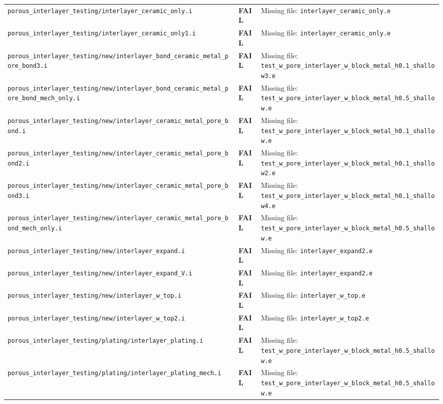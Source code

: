 \documentclass[10pt,letterpaper]{article}
\newcommand{\FAIL}{\textcolor{failred}{\textbf{FAIL}}}
\newcommand{\code}[1]{\texttt{\small #1}}
\begin{document}
\begin{longtable}{p{} l p{}}
\code{porous\_interlayer\_testing/interlayer\_ceramic\_only.i} & \FAIL & Missing file: \code{interlayer\_ceramic\_only.e} \\
\code{porous\_interlayer\_testing/interlayer\_ceramic\_only1.i} & \FAIL & Missing file: \code{interlayer\_ceramic\_only.e} \\
\code{porous\_interlayer\_testing/new/interlayer\_bond\_ceramic\_metal\_pore\_bond3.i} & \FAIL & Missing file: \code{test\_w\_pore\_interlayer\_w\_block\_metal\_h0.1\_shallow3.e} \\
\code{porous\_interlayer\_testing/new/interlayer\_bond\_ceramic\_metal\_pore\_bond\_mech\_only.i} & \FAIL & Missing file: \code{test\_w\_pore\_interlayer\_w\_block\_metal\_h0.5\_shallow.e} \\
\code{porous\_interlayer\_testing/new/interlayer\_ceramic\_metal\_pore\_bond.i} & \FAIL & Missing file: \code{test\_w\_pore\_interlayer\_w\_block\_metal\_h0.1\_shallow.e} \\
\code{porous\_interlayer\_testing/new/interlayer\_ceramic\_metal\_pore\_bond2.i} & \FAIL & Missing file: \code{test\_w\_pore\_interlayer\_w\_block\_metal\_h0.1\_shallow2.e} \\
\code{porous\_interlayer\_testing/new/interlayer\_ceramic\_metal\_pore\_bond3.i} & \FAIL & Missing file: \code{test\_w\_pore\_interlayer\_w\_block\_metal\_h0.1\_shallow4.e} \\
\code{porous\_interlayer\_testing/new/interlayer\_ceramic\_metal\_pore\_bond\_mech\_only.i} & \FAIL & Missing file: \code{test\_w\_pore\_interlayer\_w\_block\_metal\_h0.5\_shallow.e} \\
\code{porous\_interlayer\_testing/new/interlayer\_expand.i} & \FAIL & Missing file: \code{interlayer\_expand2.e} \\
\code{porous\_interlayer\_testing/new/interlayer\_expand\_V.i} & \FAIL & Missing file: \code{interlayer\_expand2.e} \\
\code{porous\_interlayer\_testing/new/interlayer\_w\_top.i} & \FAIL & Missing file: \code{interlayer\_w\_top.e} \\
\code{porous\_interlayer\_testing/new/interlayer\_w\_top2.i} & \FAIL & Missing file: \code{interlayer\_w\_top2.e} \\
\code{porous\_interlayer\_testing/plating/interlayer\_plating.i} & \FAIL & Missing file: \code{test\_w\_pore\_interlayer\_w\_block\_metal\_h0.5\_shallow.e} \\
\code{porous\_interlayer\_testing/plating/interlayer\_plating\_mech.i} & \FAIL & Missing file: \code{test\_w\_pore\_interlayer\_w\_block\_metal\_h0.5\_shallow.e} \\

\end{longtable}
\end{document}
